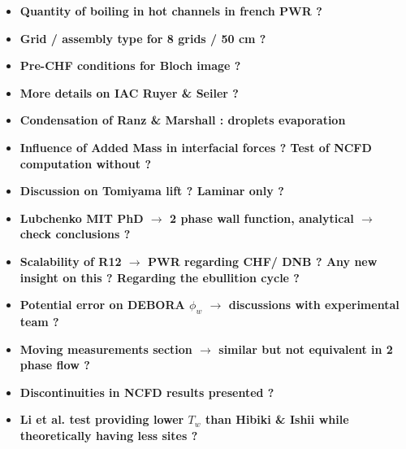\documentclass[8pt, a4paper]{article}
\begin{document}
\begin{itemize}
\setlength{\itemsep}{45pt}



\item \textbf{Quantity of boiling in hot channels in french PWR ?}


\item \textbf{Grid / assembly type for 8 grids / 50 cm ?}



\item \textbf{Pre-CHF conditions for Bloch image ?}


\item \textbf{More details on IAC Ruyer \& Seiler ?}


\item \textbf{Condensation of Ranz \& Marshall : droplets evaporation}


\item \textbf{Influence of Added Mass in interfacial forces ? Test of NCFD computation without ?}


\item \textbf{Discussion on Tomiyama lift ? Laminar only ?}


\item \textbf{Lubchenko MIT PhD $\rightarrow$ 2 phase wall function, analytical $\rightarrow$ check conclusions ?}



\item \textbf{Scalability of R12 $\rightarrow$ PWR regarding CHF/ DNB ? Any new insight on this ? Regarding the ebullition cycle ?}




\item \textbf{Potential error on DEBORA $\phi_{w}$ $\rightarrow$ discussions with experimental team ? }


\item \textbf{Moving measurements section $\rightarrow$ similar but not equivalent in 2 phase flow ?}



\item \textbf{Discontinuities in NCFD results presented ?}


\item \textbf{Li et al. test providing lower $T_{w}$ than Hibiki \& Ishii while theoretically having less sites ?}



\end{itemize}
\end{document}
